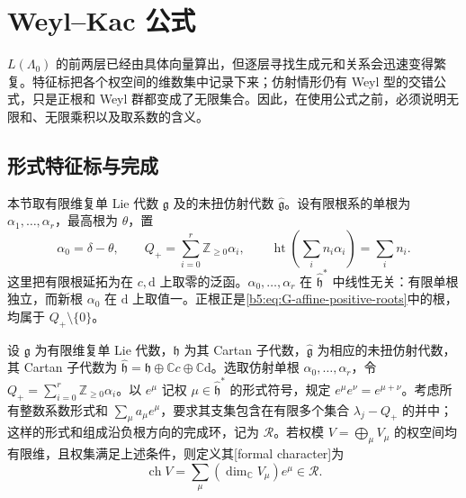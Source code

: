 
\section{Weyl–Kac 公式}
\label{b5:sec:G04}

\(L(\Lambda_0)\) 的前两层已经由具体向量算出，但逐层寻找生成元和关系会迅速变得繁复。特征标把各个权空间的维数集中记录下来；仿射情形仍有 Weyl 型的交错公式，只是正根和 Weyl 群都变成了无限集合。因此，在使用公式之前，必须说明无限和、无限乘积以及取系数的含义。

\subsection{形式特征标与完成}
\label{b5:subsec:G04:01}

本节取有限维复单 Lie 代数 \(\mathfrak g\) 及的未扭仿射代数 \(\widehat{\mathfrak g}\)。设有限根系的单根为 \(\alpha_1,\ldots,\alpha_r\)，最高根为 \(\theta\)，置
\[
	\alpha_0=\delta-\theta,\qquad
	Q_+=\sum_{i=0}^r\mathbb Z_{\ge0}\alpha_i,\qquad
	\operatorname{ht}\!\left(\sum_i n_i\alpha_i\right)=\sum_i n_i.
\]
这里把有限根延拓为在 \(c,\mathrm d\) 上取零的泛函。\(\alpha_0,\ldots,\alpha_r\) 在 \(\widehat{\mathfrak h}^*\) 中线性无关：有限单根独立，而新根 \(\alpha_0\) 在 \(\mathrm d\) 上取值一。正根正是\eqref{b5:eq:G-affine-positive-roots}中的根，均属于 \(Q_+\setminus\{0\}\)。

\begin{definition}\label{b5:def:G-character-completion}
	设 \(\mathfrak g\) 为有限维复单 Lie 代数，\(\mathfrak h\) 为其 Cartan 子代数，\(\widehat{\mathfrak g}\) 为相应的未扭仿射代数，其 Cartan 子代数为 \(\widehat{\mathfrak h}=\mathfrak h\oplus\mathbb Cc\oplus\mathbb C\mathrm d\)。选取仿射单根 \(\alpha_0,\ldots,\alpha_r\)，令 \(Q_+=\sum_{i=0}^r\mathbb Z_{\ge0}\alpha_i\)。以 \(e^\mu\) 记权 \(\mu\in\widehat{\mathfrak h}^*\) 的形式符号，规定 \(e^\mu e^\nu=e^{\mu+\nu}\)。考虑所有整数系数形式和 \(\sum_\mu a_\mu e^\mu\)，要求其支集包含在有限多个集合 \(\lambda_j-Q_+\) 的并中；这样的形式和组成沿负根方向的完成环，记为 \(\mathscr R\)。若权模 \(V=\bigoplus_\mu V_\mu\) 的权空间均有限维，且权集满足上述条件，则定义其[formal character]为
	\[
		\operatorname{ch}V=\sum_\mu(\dim_{\mathbb C}V_\mu)e^\mu\in\mathscr R.
	\]
\end{definition}

